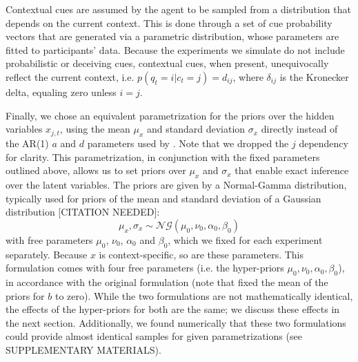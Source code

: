 \documentclass[a4paper,doc,floatsintext,natbib]{apa6}%
\begin{document}
Contextual cues are assumed by the agent to be sampled from a distribution that depends on the current context. This is done through a set of cue probability vectors that are generated via a parametric distribution, whose parameters are fitted to participants' data. Because the experiments we simulate do not include probabilistic or deceiving cues, contextual cues, when present, unequivocally reflect the current context, i.e. $p(q_t = i | c_t = j) = d_{ij}$, where $\delta_{ij}$ is the Kronecker delta, equaling zero unless $i = j$.

Finally, we chose an equivalent parametrization for the priors over the hidden variables $x_{j,t}$, using the mean $\mu_x$ and standard deviation $\sigma_x$ directly instead of the AR(1) $a$ and $d$ parameters used by \cite{Heald_Contextual_2021}. Note that we dropped the $j$ dependency for clarity. This parametrization, in conjunction with the fixed parameters outlined above,  allows us to set priors over $\mu_x$ and $\sigma_x$ that enable exact inference over the latent variables. The priors are given by a Normal-Gamma distribution, typically used for priors of the mean and standard deviation of a Gaussian distribution [CITATION NEEDED]:
\begin{equation}
\mu_x, \sigma_x \sim \mathcal{NG}(\mu_0, \nu_0, \alpha_0, \beta_0)
\end{equation}
with free parameters $\mu_0$, $\nu_0$, $\alpha_0$ and $\beta_0$, which we fixed for each experiment separately. Because $x$ is context-specific, so are these parameters. This formulation comes with four free parameters (i.e. the hyper-priors $\mu_0, \nu_0, \alpha_0, \beta_0$), in accordance with the original formulation (note that \cite{Heald_Contextual_2021} fixed the mean of the priors for $b$ to zero). While the two formulations are not mathematically identical, the effects of the hyper-priors for both are the same; we discuss these effects in the next section. Additionally, we found numerically that these two formulations could provide almost identical samples for given parametrizations (see SUPPLEMENTARY MATERIALS). 
\end{document}
